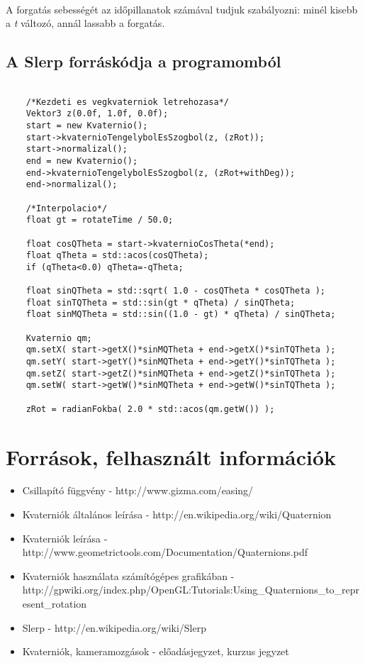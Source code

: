 \documentclass[10pt,a4paper]{article}
\begin{document}
\paragraph*{}
A forgatás sebességét az időpillanatok számával tudjuk szabályozni: minél kisebb a \textit{t} változó, annál lassabb a forgatás.
\pagebreak
\subsection*{A Slerp forráskódja a programomból}
\begin{lstlisting}

	/*Kezdeti es vegkvaterniok letrehozasa*/
	Vektor3 z(0.0f, 1.0f, 0.0f);		
	start = new Kvaternio();
	start->kvaternioTengelybolEsSzogbol(z, (zRot));
	start->normalizal();
	end = new Kvaternio();
	end->kvaternioTengelybolEsSzogbol(z, (zRot+withDeg));	
	end->normalizal();	
		
	/*Interpolacio*/
	float gt = rotateTime / 50.0;
	
	float cosQTheta = start->kvaternioCosTheta(*end);	
	float qTheta = std::acos(cosQTheta);				
	if (qTheta<0.0) qTheta=-qTheta;

	float sinQTheta = std::sqrt( 1.0 - cosQTheta * cosQTheta );	
	float sinTQTheta = std::sin(gt * qTheta) / sinQTheta;
	float sinMQTheta = std::sin((1.0 - gt) * qTheta) / sinQTheta;
	
	Kvaternio qm;
	qm.setX( start->getX()*sinMQTheta + end->getX()*sinTQTheta );
	qm.setY( start->getY()*sinMQTheta + end->getY()*sinTQTheta );
	qm.setZ( start->getZ()*sinMQTheta + end->getZ()*sinTQTheta );
	qm.setW( start->getW()*sinMQTheta + end->getW()*sinTQTheta );

	zRot = radianFokba( 2.0 * std::acos(qm.getW()) );	
\end{lstlisting}

\section*{Források, felhasznált információk}

\begin{itemize}
\item Csillapító függvény - http://www.gizma.com/easing/
\item Kvaterniók általános leírása - http://en.wikipedia.org/wiki/Quaternion
\item Kvaterniók leírása - http://www.geometrictools.com/Documentation/Quaternions.pdf
\item Kvaterniók használata számítógépes grafikában - \linebreak http://gpwiki.org/index.php/OpenGL:Tutorials:Using\_Quaternions\_to\_represent\_rotation
\item Slerp - http://en.wikipedia.org/wiki/Slerp
\item Kvaterniók, kameramozgások - előadásjegyzet, kurzus jegyzet
\end{itemize}
\end{document}
